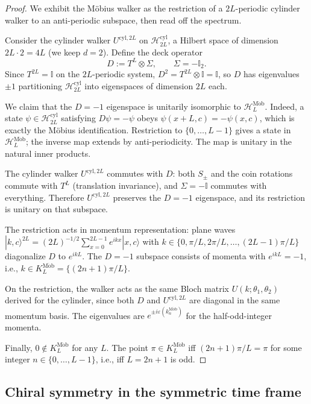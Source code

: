 \documentclass[aps,pra,reprint,amsmath,amssymb,superscriptaddress,nofootinbib,longbibliography]{revtex4-2}
\newcommand{\I}{\mathbb{I}}
\newcommand{\ket}[1]{| #1 \rangle}
\newcommand{\Mob}{\mathrm{M\ddot{o}b}}
\newcommand{\cyl}{\mathrm{cyl}}
\begin{document}
\begin{proof}
We exhibit the M\"obius walker as the restriction of a $2L$-periodic cylinder walker to an anti-periodic subspace, then read off the spectrum.

Consider the cylinder walker $U^{\cyl,2L}$ on $\mathcal{H}_{2L}^\cyl$, a Hilbert space of dimension $2L \cdot 2 = 4L$ (we keep $d = 2$). Define the deck operator
\begin{equation}
D := T^L \otimes \Sigma, \qquad \Sigma = -\I_2.
\end{equation}
Since $T^{2L} = \I$ on the $2L$-periodic system, $D^2 = T^{2L} \otimes \I = \I$, so $D$ has eigenvalues $\pm 1$ partitioning $\mathcal{H}_{2L}^\cyl$ into eigenspaces of dimension $2L$ each.

We claim that the $D = -1$ eigenspace is unitarily isomorphic to $\mathcal{H}_L^\Mob$. Indeed, a state $\psi \in \mathcal{H}_{2L}^\cyl$ satisfying $D \psi = -\psi$ obeys $\psi(x + L, c) = -\psi(x, c)$, which is exactly the M\"obius identification. Restriction to $\{0, \dots, L-1\}$ gives a state in $\mathcal{H}_L^\Mob$; the inverse map extends by anti-periodicity. The map is unitary in the natural inner products.

The cylinder walker $U^{\cyl, 2L}$ commutes with $D$: both $S_\pm$ and the coin rotations commute with $T^L$ (translation invariance), and $\Sigma = -\I$ commutes with everything. Therefore $U^{\cyl, 2L}$ preserves the $D = -1$ eigenspace, and its restriction is unitary on that subspace.

The restriction acts in momentum representation: plane waves $\ket{k, c}^{2L} = (2L)^{-1/2} \sum_{x=0}^{2L-1} e^{ikx} \ket{x, c}$ with $k \in \{0, \pi/L, 2\pi/L, \dots, (2L-1)\pi/L\}$ diagonalize $D$ to $e^{ikL}$. The $D = -1$ subspace consists of momenta with $e^{ikL} = -1$, i.e., $k \in K_L^\Mob = \{(2n+1)\pi/L\}$.

On the restriction, the walker acts as the same Bloch matrix $U(k; \theta_1, \theta_2)$ derived for the cylinder, since both $D$ and $U^{\cyl, 2L}$ are diagonal in the same momentum basis. The eigenvalues are $e^{\pm i \varepsilon(k_n^\Mob)}$ for the half-odd-integer momenta.

Finally, $0 \notin K_L^\Mob$ for any $L$. The point $\pi \in K_L^\Mob$ iff $(2n+1)\pi/L = \pi$ for some integer $n \in \{0, \dots, L-1\}$, i.e., iff $L = 2n+1$ is odd.
\end{proof}

\subsection{Chiral symmetry in the symmetric time frame}
\end{document}
